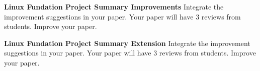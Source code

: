 \begin{exercise} {\bf Linux Fundation Project Summary Improvements}
Integrate the improvement suggestions in your paper. Your paper will
have 3 reviews from students. Improve your paper.
\end{exercise} 

\begin{exercise} {\bf Linux Fundation Project Summary Extension}
Integrate the improvement suggestions in your paper. Your paper will
have 3 reviews from students. Improve your paper.
\end{exercise} 


